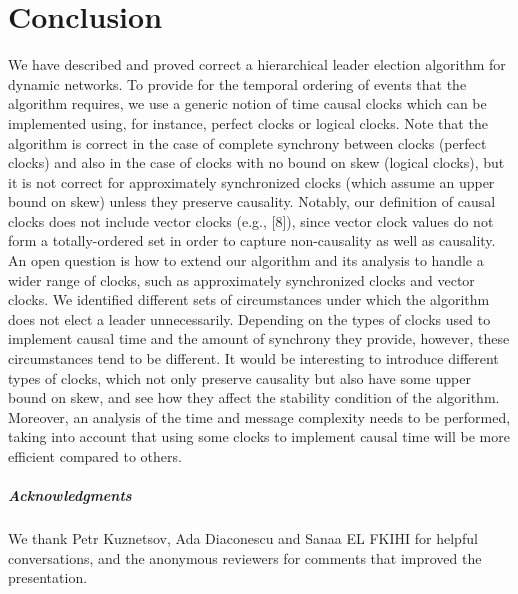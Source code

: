 \chapter{Conclusion}

We have described and proved correct a hierarchical leader election algorithm for dynamic networks. To provide for the temporal ordering of events that the algorithm requires, we use a generic notion of time causal clocks which can be implemented using, for instance, perfect clocks or logical clocks. Note that the algorithm is correct in the case of complete synchrony between clocks (perfect clocks) and also in the case of clocks with no bound on skew (logical clocks), but it is not correct for approximately synchronized clocks (which assume an upper bound on skew) unless they preserve causality. Notably, our definition of causal clocks does not include vector clocks (e.g., [8]), since vector clock values do not form a totally-ordered set in order to capture non-causality as well as causality. An open question is how to extend our algorithm and its analysis to handle a wider range of clocks, such as approximately synchronized clocks and vector clocks. We identified different sets of circumstances under which the algorithm does not elect a leader unnecessarily. Depending on the types of clocks used to implement causal time and the amount of synchrony they provide, however, these circumstances tend to be different. It would be interesting to introduce different types of clocks, which not only preserve causality but also have some upper bound on skew, and see how they affect the stability condition of the algorithm. Moreover, an analysis of the time and message complexity needs to be performed, taking into account that using some clocks to implement causal time will be more efficient compared to others.

\paragraph{Acknowledgments}We thank Petr Kuznetsov, Ada Diaconescu and Sanaa EL FKIHI for helpful conversations, and the anonymous reviewers for comments that improved the presentation.

